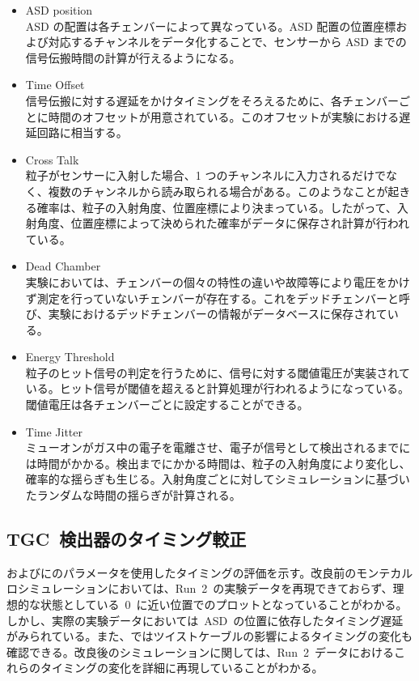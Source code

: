 \begin{itemize}
\item ASD position\\
ASD の配置は各チェンバーによって異なっている。ASD 配置の位置座標および対応するチャンネルをデータ化することで、センサーから ASD までの信号伝搬時間の計算が行えるようになる。
\item Time Offset\\
信号伝搬に対する遅延をかけタイミングをそろえるために、各チェンバーごとに時間のオフセットが用意されている。このオフセットが実験における遅延回路に相当する。
\item Cross Talk\\
粒子がセンサーに入射した場合、1 つのチャンネルに入力されるだけでなく、複数のチャンネルから読み取られる場合がある。このようなことが起きる確率は、粒子の入射角度、位置座標により決まっている。したがって、入射角度、位置座標によって決められた確率がデータに保存され計算が行われている。
\item Dead Chamber\\
実験においては、チェンバーの個々の特性の違いや故障等により電圧をかけず測定を行っていないチェンバーが存在する。これをデッドチェンバーと呼び、実験におけるデッドチェンバーの情報がデータベースに保存されている。
\item Energy Threshold\\
粒子のヒット信号の判定を行うために、信号に対する閾値電圧が実装されている。ヒット信号が閾値を超えると計算処理が行われるようになっている。閾値電圧は各チェンバーごとに設定することができる。
\item Time Jitter\\
ミューオンがガス中の電子を電離させ、電子が信号として検出されるまでには時間がかかる。検出までにかかる時間は、粒子の入射角度により変化し、確率的な揺らぎも生じる。入射角度ごとに対してシミュレーションに基づいたランダムな時間の揺らぎが計算される。
\end{itemize}

\subsection{TGC~検出器のタイミング較正}\label{subsec:cali}
およびにのパラメータを使用したタイミングの評価を示す。改良前のモンテカルロシミュレーションにおいては、Run~2~の実験データを再現できておらず、理想的な状態としている~0~に近い位置でのプロットとなっていることがわかる。しかし、実際の実験データにおいては~ASD~の位置に依存したタイミング遅延がみられている。また、ではツイストケーブルの影響によるタイミングの変化も確認できる。改良後のシミュレーションに関しては、Run~2~データにおけるこれらのタイミングの変化を詳細に再現していることがわかる。


